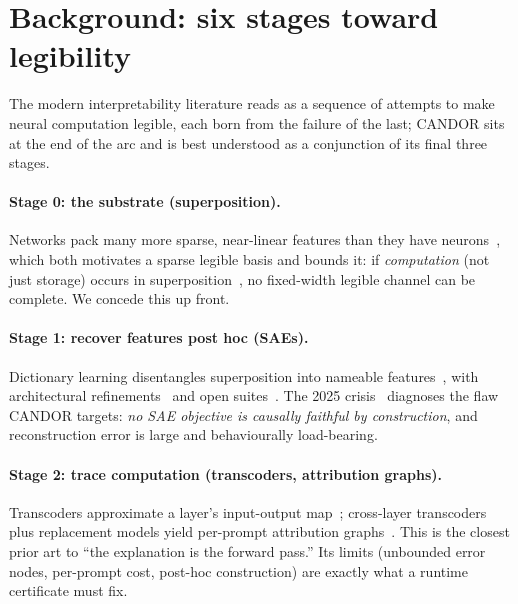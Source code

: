 \documentclass[11pt]{article}
\begin{document}
\section{Background: six stages toward legibility}
\label{sec:bg}
The modern interpretability literature reads as a sequence of attempts to make neural
computation legible, each born from the failure of the last; CANDOR sits at the end of
the arc and is best understood as a conjunction of its final three stages.

\paragraph{Stage 0: the substrate (superposition).} Networks pack many more sparse,
near-linear features than they have neurons~\citep{elhage2022superposition,
elhage2021framework,olah2020zoomin}, which both motivates a sparse legible basis and
bounds it: if \emph{computation} (not just storage) occurs in
superposition~\citep{hanni2024compsuperposition}, no fixed-width legible channel can be
complete. We concede this up front.

\paragraph{Stage 1: recover features post hoc (SAEs).} Dictionary learning
disentangles superposition into nameable
features~\citep{bricken2023monosemanticity,cunningham2023sparse,templeton2024scaling,
gao2024scaling}, with architectural refinements~\citep{rajamanoharan2024jumprelu,
bussmann2024batchtopk,bussmann2025matryoshka} and open suites~\citep{lieberum2024gemmascope}.
The 2025 crisis~\citep{leask2025canonical,kantamneni2025useful,chanin2024absorption}
diagnoses the flaw CANDOR targets: \emph{no SAE objective is causally faithful by
construction}, and reconstruction error is large and behaviourally load-bearing.

\paragraph{Stage 2: trace computation (transcoders, attribution graphs).}
Transcoders approximate a layer's input-output map~\citep{dunefsky2024transcoders};
cross-layer transcoders plus replacement models yield per-prompt attribution
graphs~\citep{ameisen2025circuit,lindsey2025biology,marks2024sparse}. This is the
closest prior art to ``the explanation is the forward pass.'' Its limits (unbounded
error nodes, per-prompt cost, post-hoc construction) are exactly what a runtime
certificate must fix.
\end{document}
